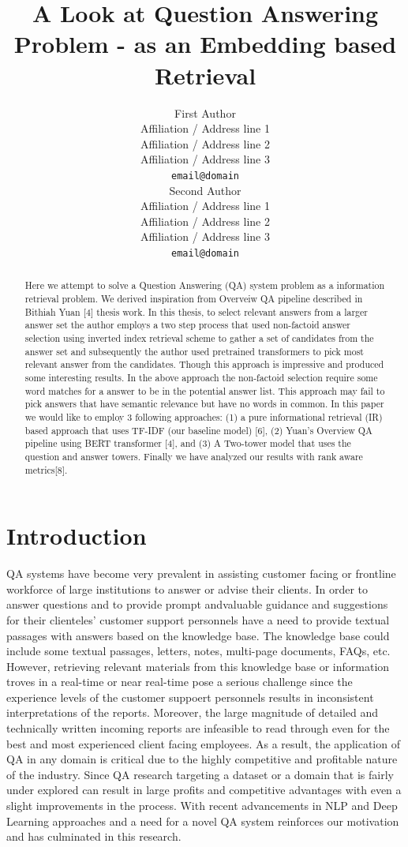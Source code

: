 \documentclass[11pt,a4paper]{article}
\title{A Look at Question Answering Problem - as an Embedding based Retrieval}
\author{First Author \\
  Affiliation / Address line 1 \\
  Affiliation / Address line 2 \\
  Affiliation / Address line 3 \\
  \texttt{email@domain} \\\And
  Second Author \\
  Affiliation / Address line 1 \\
  Affiliation / Address line 2 \\
  Affiliation / Address line 3 \\
  \texttt{email@domain} \\}
\date{}
\begin{document}
\maketitle
\begin{abstract}
Here we attempt to solve a Question Answering (QA) system problem as a information retrieval problem. We derived inspiration from Overveiw QA pipeline described in Bithiah Yuan [4] thesis work. In this thesis, to select relevant answers from a larger answer set the author employs a two step process that used non-factoid answer selection using inverted index retrieval scheme to gather a set of candidates from the answer set and subsequently the author used pretrained transformers to pick most relevant answer from the candidates. Though this approach is impressive and produced some interesting results. In the above approach the non-factoid selection require some word matches for a answer to be in the potential answer list. This approach may fail to pick answers that have semantic relevance but have no words in common. In this paper we would like to employ 3 following approaches: (1) a pure informational retrieval (IR) based approach that uses TF-IDF (our baseline model) [6], (2) Yuan's Overview QA pipeline using BERT transformer [4], and (3) A Two-tower model that uses the question and answer towers. Finally we have analyzed our results with rank aware metrics[8].


\end{abstract}

\section{Introduction}

QA systems have become very prevalent in assisting customer facing or frontline workforce of large institutions to answer or advise their clients. In order to answer questions and to provide prompt andvaluable guidance and suggestions for their clienteles'  customer support personnels have a need to provide textual passages
with answers based on the knowledge base. The knowledge base could include some textual passages, letters, notes, multi-page documents, FAQs, etc. However, retrieving relevant materials from this knowledge base or information troves in a real-time or near real-time pose a serious challenge since the experience levels of the customer suppoert personnels results in inconsistent interpretations of the reports. Moreover, the large magnitude of detailed and technically written incoming reports are infeasible to read through even for the best and most experienced client facing employees. As a result, the application of QA in any domain is critical due to the highly competitive and profitable nature of the industry. Since QA research targeting a dataset or a domain that is fairly under explored can result in large profits and competitive advantages with even a slight improvements in the process. With recent advancements in NLP and Deep Learning approaches and a need for a novel QA system reinforces our motivation and has culminated in this research.
\end{document}
